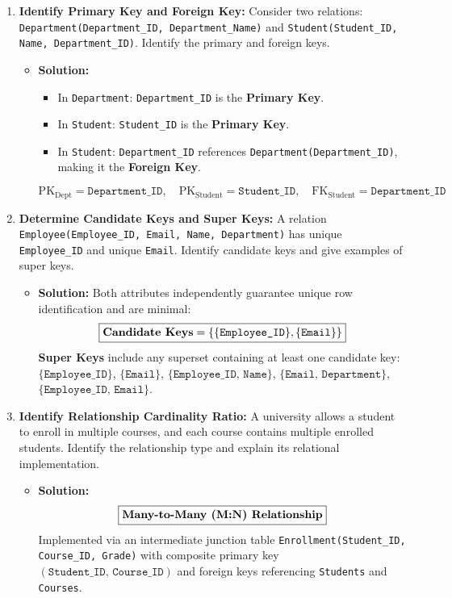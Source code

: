 \begin{enumerate}[label=\textbf{Problem \arabic*.},leftmargin=1.5cm]
\item \textbf{Identify Primary Key and Foreign Key:}
Consider two relations: \texttt{Department(Department\_ID, Department\_Name)} and \texttt{Student(Student\_ID, Name, Department\_ID)}. Identify the primary and foreign keys.
\begin{itemize}
\item \textbf{Solution:}
\begin{itemize}
\item In \texttt{Department}: \texttt{Department\_ID} is the \textbf{Primary Key}.
\item In \texttt{Student}: \texttt{Student\_ID} is the \textbf{Primary Key}.
\item In \texttt{Student}: \texttt{Department\_ID} references \texttt{Department(Department\_ID)}, making it the \textbf{Foreign Key}.
\end{itemize}
\[ \boxed{\text{PK}_{\text{Dept}} = \texttt{Department\_ID}, \quad \text{PK}_{\text{Student}} = \texttt{Student\_ID}, \quad \text{FK}_{\text{Student}} = \texttt{Department\_ID}} \]
\end{itemize}

\item \textbf{Determine Candidate Keys and Super Keys:}
A relation \texttt{Employee(Employee\_ID, Email, Name, Department)} has unique \texttt{Employee\_ID} and unique \texttt{Email}. Identify candidate keys and give examples of super keys.
\begin{itemize}
\item \textbf{Solution:}
Both attributes independently guarantee unique row identification and are minimal:
\[ \boxed{\text{\textbf{Candidate Keys}} = \{\{\texttt{Employee\_ID}\}, \{\texttt{Email}\}\}} \]
\textbf{Super Keys} include any superset containing at least one candidate key: $\{\texttt{Employee\_ID}\}$, $\{\texttt{Email}\}$, $\{\texttt{Employee\_ID, Name}\}$, $\{\texttt{Email, Department}\}$, $\{\texttt{Employee\_ID, Email}\}$.
\end{itemize}

\item \textbf{Identify Relationship Cardinality Ratio:}
A university allows a student to enroll in multiple courses, and each course contains multiple enrolled students. Identify the relationship type and explain its relational implementation.
\begin{itemize}
\item \textbf{Solution:}
\[ \boxed{\text{\textbf{Many-to-Many (M:N) Relationship}}} \]
Implemented via an intermediate junction table \texttt{Enrollment(Student\_ID, Course\_ID, Grade)} with composite primary key $(\texttt{Student\_ID, Course\_ID})$ and foreign keys referencing \texttt{Students} and \texttt{Courses}.
\end{itemize}
\end{enumerate}

